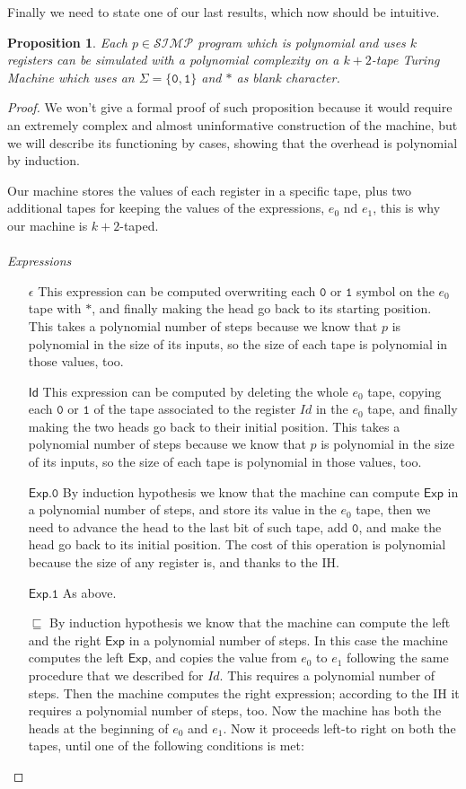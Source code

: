 \documentclass[10pt]{amsart}
\newcommand{\SIMP}{\mathcal{SIMP}}
\newcommand{\zero}{\mathtt{0}}
\newcommand{\one}{\mathtt{1}}
\newcommand{\id}{\mathsf{Id}}
\newcommand{\xp}{\mathsf{Exp}}
\newtheorem{prop}{Proposition}
\begin{document}
Finally we need to state one of our last results, which now should be intuitive.

\begin{prop}
Each $p \in\SIMP$ program which is polynomial and uses $k$ registers can be simulated with a polynomial complexity on a $k+2$-tape Turing Machine which uses an $\Sigma=\{\zero, \one\}$ and $*$ as blank character.
\end{prop}

\begin{proof}
We won't give a formal proof of such proposition because it would require an extremely complex and almost uninformative construction of the machine, but we will describe its functioning by cases, showing that the overhead is polynomial by induction.

Our machine stores the values of each register in a specific tape, plus two additional tapes for keeping the values of the expressions, $e_0$ nd $e_1$, this is why our machine is $k+2$-taped.
\\\\
\emph{Expressions}
\begin{itemize}
\item[$\epsilon$] This expression can be computed overwriting each $\zero$ or $\one$ symbol on the $e_0$ tape with $*$, and finally making the head go back to its starting position. This takes a polynomial number of steps because we know that $p$ is polynomial in the size of its inputs, so the size of each tape is polynomial in those values, too.
\item[$\id$] This expression can be computed by deleting the whole $e_0$ tape, copying each $\zero$ or $\one$ of the tape associated to the register $Id$ in the $e_0$ tape, and finally making the two heads go back to their initial position. This takes a polynomial number of steps because we know that $p$ is polynomial in the size of its inputs, so the size of each tape is polynomial in those values, too.
\item[$\xp.\zero$] By induction hypothesis we know that the machine can compute $\xp$ in a polynomial number of steps, and store its value in the $e_0$ tape, then we need to advance the head to the last bit of such tape, add $\zero$, and make the head go back to its initial position. The cost of this operation is polynomial because the size of any register is, and thanks to the IH.
\item[$\xp.\one$] As above.
\item[$\sqsubseteq$] By induction hypothesis we know that the machine can compute the left and the right $\xp$ in a polynomial number of steps. In this case the machine computes the left $\xp$, and copies the value from $e_0$ to $e_1$ following the same procedure that we described for $Id$. This requires a polynomial number of steps. Then the machine computes the right expression; according to the IH it requires a polynomial number of steps, too. Now the machine has both the heads at the beginning of $e_0$ and $e_1$. Now it proceeds left-to right on both the tapes, until one of the following conditions is met:

\end{itemize}
\end{proof}
\end{document}
